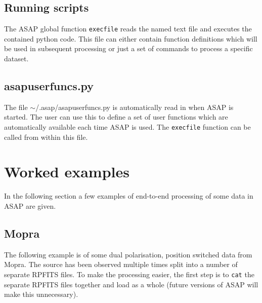 \documentclass[11pt]{article}
\newcommand{\cmd}[1]{{\tt #1}}
\begin{document}
\subsection{Running scripts}

The ASAP global function \cmd{execfile} reads the named text file and
executes the contained python code. This file can either contain
function definitions which will be used in subsequent processing or
just a set of commands to process a specific dataset.

\subsection{asapuserfuncs.py}

The file $\sim$/.asap/asapuserfuncs.py is automatically read in when
ASAP is started. The user can use this to define a set of user
functions which are automatically available each time ASAP is
used. The \cmd{execfile} function can be called from within this file.

\section{Worked examples}

In the following section a few examples of end-to-end processing of
some data in ASAP are given.

\subsection{Mopra}

The following example is of some dual polarisation, position switched
data from Mopra. The source has been observed multiple times split
into a number of separate RPFITS files. To make the processing easier,
the first step is to \cmd{cat} the separate RPFITS files together and
load as a whole (future versions of ASAP will make this unnecessary).
\end{document}
